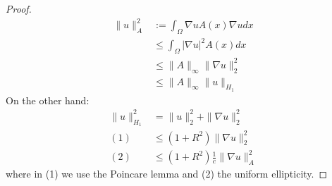 \begin{proof}
	\begin{align*}
		\|u\|_A^2 &:= \int_\Omega \nabla u A(x) \nabla u dx\\ 
		&\leq \int_\Omega |\nabla u|^2 A(x)dx\\
		&\leq \|A\|_\infty \|\nabla u\|_2^2 \\
		&\leq \|A\|_\infty \|u\|_{H_1}
	\end{align*}
	On the other hand:
	\begin{align*}
		\|u\|_{H_1}^2 &= \|u\|_2^2 + \|\nabla u\|^2_2\\
		(1)&\leq (1 + R^2) \|\nabla u\|^2_2\\
		(2)&\leq (1 + R^2) \frac{1}{c} \|\nabla u\|_A^2
	\end{align*}
	where in (1) we use the Poincare lemma and (2) the uniform ellipticity.
\end{proof}

